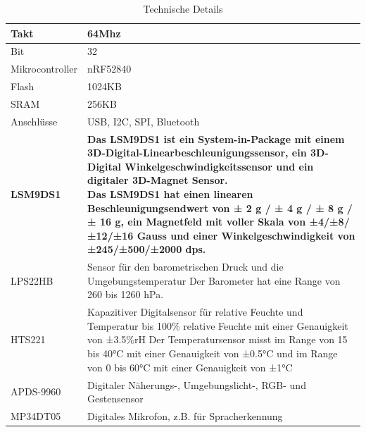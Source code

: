 \begin{table}[H]
  \centering
  \settowidth{}
  \setlength\extrarowheight{2pt}
  \begin{tabulary}{1.0\textwidth}{|L|L|}
    \hline
    Takt &
    64Mhz\\
    \hline
    Bit & 32 \\
    \hline
    Mikrocontroller& nRF52840 \\
    \hline
    Flash & 1024KB \\
    \hline
    SRAM&  256KB\\
    \hline
    Anschlüsse& USB, I2C, SPI, Bluetooth \\
    \hline
    \textbf{LSM9DS1}& \textbf{Das LSM9DS1 ist ein System-in-Package mit einem 3D-Digital-Linearbeschleunigungssensor, ein 3D-Digital Winkelgeschwindigkeitssensor und ein digitaler 3D-Magnet Sensor.\newline
    Das LSM9DS1 hat einen linearen Beschleunigungsendwert von ± 2 g / ± 4 g / ± 8 g / ± 16 g, ein Magnetfeld mit voller Skala von ±4/±8/±12/±16 Gauss und einer Winkelgeschwindigkeit von ±245/±500/±2000 dps. } \\
    \hline
    LPS22HB& Sensor für den barometrischen Druck und die Umgebungstemperatur\newline
    Der Barometer hat eine Range von 260 bis 1260 hPa.\\
    \hline
    HTS221 & Kapazitiver Digitalsensor für relative Feuchte und Temperatur bis 100\% relative Feuchte mit einer Genauigkeit von ±3.5\%rH\newline
    Der Temperatursensor misst im Range von 15 bis 40°C mit einer Genauigkeit von ±0.5°C und im Range von 0 bis 60°C mit einer Genauigkeit von ±1°C\\
    \hline
    APDS-9960& Digitaler Näherungs-, Umgebungslicht-, RGB- und Gestensensor \\
    \hline
    MP34DT05& Digitales Mikrofon, z.B. für Spracherkennung \\
    \hline
  \end{tabulary}
  \caption{Technische Details}
\end{table}

\newpage